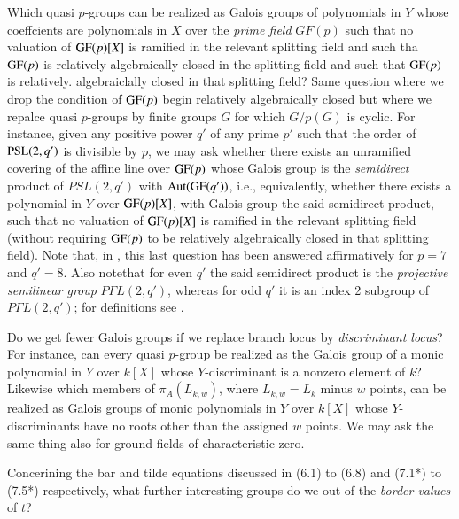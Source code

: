 \begin{question}\label{chap1-qus9.3}
Which quasi $p$-groups can be realized as Galois groups of polynomials in $Y$ whose coeffcients are polynomials in $X$ over the \textit{prime field} $GF(p)$ such that no valuation of $\operatorname{GF}(p)[X]$ is ramified in the relevant splitting field and such tha $\operatorname{GF}(p)$ is relatively algebraically closed in the splitting field and such that $\operatorname{GF}(p)$ is relatively. algebraiclally closed in that splitting field? Same question where we drop the condition of $\operatorname{GF}(p)$ begin relatively algebraically closed but where we repalce quasi $p$-groups by finite groups  $G$ for which $G/p(G)$ is cyclic. For instance, given any positive power $q'$ of any prime $p'$ such that the order of $\operatorname{PSL}(2,q')$ is divisible by $p$, we may ask whether there exists an unramified covering of the affine line over $\operatorname{GF}(p)$ whose Galois group is the \textit{semidirect} product of $PSL(2,q')$ with $\operatorname{Aut}(\operatorname{GF}(q'))$, i.e., equivalently, whether there exists a polynomial in $Y$ over $\operatorname{GF}(p)[X]$, with Galois group the said semidirect product, such that no valuation of $\operatorname{GF}(p)[X]$ is ramified in the relevant splitting field (without requiring $\operatorname{GF}(p)$ to be relatively algebraically closed in that splitting field). Note that, in \cite{chap1-key9}, this last question has been answered affirmatively for $p=7$ and $q' =8$. Also note\pageoriginale that for even $q'$ the said semidirect product is the \textit{projective semilinear group} $P\Gamma L(2,q')$, whereas for odd $q'$ it is an index 2 subgroup of $P\Gamma L(2,q')$; for definitions see \cite{chap1-key8}.
\end{question}

\begin{question}\label{chap1-qus9.4}
Do we get fewer Galois groups if we replace branch locus by \textit{discriminant locus}? For instance, can every quasi
$p$-group be realized as the Galois group of a monic polynomial in $Y$ over $k[X]$ whose $Y$-discriminant is a nonzero element of $k$? Likewise which members of $\pi_{A}(L_{k,w})$, where $L_{k,w} = L_{k}$ minus $w$ points, can be realized as Galois groups of monic polynomials in $Y$ over $k[X]$ whose $Y$-discriminants have no roots other than the assigned $w$ points. We may ask the same thing also for ground fields of characteristic zero.
\end{question}

\begin{question}\label{chap1-qus9.5}
Concerining the bar and tilde equations discussed in (6.1) to (6.8) and (7.1*) to (7.5*) respectively, what further interesting groups do we out of the \textit{border values} of $t$?
\end{question}


